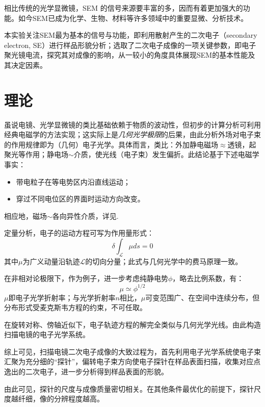 \documentclass[a4paper]{article}
\begin{document}
相比传统的光学显微镜，SEM 的信号来源要丰富的多，因而有着更加强大的功能。如今SEM已成为化学、生物、材料等许多领域中的重要显微、分析技术。
	
本实验关注SEM最为基本的信号与功能，即利用散射产生的二次电子（secondary electron, SE）进行样品形貌分析；选取了二次电子成像的一项关键参数，即电子聚光镜电流，探究其对成像的影响，从一较小的角度具体展现SEM的基本性能及其决定因素。

\newpage
\section{理论}\label{theory}%
虽说电镜、光学显微镜的类比基础依赖于物质的波动性，但初步的计算分析可利用经典电磁学的方法实现；这实际上是\textit{几何光学极限}的后果，由此分析外场对电子束的作用规律即为（几何）电子光学。具体而言，类比：外加静电磁场$\approx$透镜，起聚光等作用；静电场$\sim$介质，使光线（电子束）发生偏折。此结论基于下述电磁学事实：
\begin{itemize}
\item 带电粒子在等电势区内沿直线运动；
\item 穿过不同电位区的界面时运动方向改变。
\end{itemize}
相应地，磁场$\sim$各向异性介质，详见\cite{textbook}. 

定量分析，电子的运动方程可写为作用量形式：
\begin{equation}
	\delta\int_\mathcal{L} \mu ds = 0
\end{equation}
其中$\mu$为广义动量沿轨迹$\mathcal{L}$的切向分量；此式与几何光学中的费马原理一致。

在非相对论极限下，作为例子，进一步考虑纯静电势$\phi$，略去比例系数，有\cite{textbook}：
\begin{equation}
	\mu \simeq \phi^{1/2}
\end{equation}
$\mu$即电子光学折射率；与光学折射率$n$相比，$\mu$可变范围广、在空间中连续分布，但分布形式受麦克斯韦方程的约束，不可任取。

在旋转对称、傍轴近似下，电子轨迹方程的解完全类似与几何光学光线。由此构造扫描电镜的电子光学系统。

综上可见，扫描电镜二次电子成像的大致过程为，首先利用电子光学系统使电子束汇聚为充分细的“探针”，偏转电子束方向使电子探针在样品表面扫描，收集对应点逸出的二次电子，进一步分析得到样品表面的形貌。

由此可见，探针的尺度与成像质量密切相关。在其他条件最优化的前提下，探针尺度越纤细，像的分辨程度越高。
\end{document}
